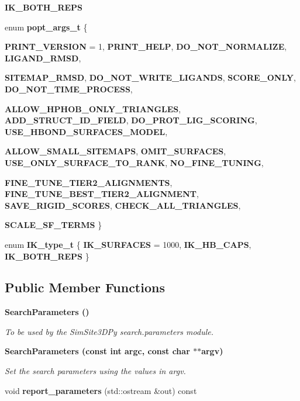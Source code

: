 \begin{CompactItemize}
\item 
\textbf{IK\_\-BOTH\_\-REPS}\label{classSimSite3D_1_1SearchParameters_c267aed4ea246dc936ccd5b47b71712d1aa6526aee8d82d030cda47ac9831efb}

\item 
enum \textbf{popt\_\-args\_\-t} \{ \par
\textbf{PRINT\_\-VERSION} =  1, 
\textbf{PRINT\_\-HELP}, 
\textbf{DO\_\-NOT\_\-NORMALIZE}, 
\textbf{LIGAND\_\-RMSD}, 
\par
\textbf{SITEMAP\_\-RMSD}, 
\textbf{DO\_\-NOT\_\-WRITE\_\-LIGANDS}, 
\textbf{SCORE\_\-ONLY}, 
\textbf{DO\_\-NOT\_\-TIME\_\-PROCESS}, 
\par
\textbf{ALLOW\_\-HPHOB\_\-ONLY\_\-TRIANGLES}, 
\textbf{ADD\_\-STRUCT\_\-ID\_\-FIELD}, 
\textbf{DO\_\-PROT\_\-LIG\_\-SCORING}, 
\textbf{USE\_\-HBOND\_\-SURFACES\_\-MODEL}, 
\par
\textbf{ALLOW\_\-SMALL\_\-SITEMAPS}, 
\textbf{OMIT\_\-SURFACES}, 
\textbf{USE\_\-ONLY\_\-SURFACE\_\-TO\_\-RANK}, 
\textbf{NO\_\-FINE\_\-TUNING}, 
\par
\textbf{FINE\_\-TUNE\_\-TIER2\_\-ALIGNMENTS}, 
\textbf{FINE\_\-TUNE\_\-BEST\_\-TIER2\_\-ALIGNMENT}, 
\textbf{SAVE\_\-RIGID\_\-SCORES}, 
\textbf{CHECK\_\-ALL\_\-TRIANGLES}, 
\par
\textbf{SCALE\_\-SF\_\-TERMS}
 \}
\item 
enum \textbf{IK\_\-type\_\-t} \{ \textbf{IK\_\-SURFACES} =  1000, 
\textbf{IK\_\-HB\_\-CAPS}, 
\textbf{IK\_\-BOTH\_\-REPS}
 \}
\end{CompactItemize}
\subsection*{Public Member Functions}
\begin{CompactItemize}
\item 
\bf{Search\-Parameters} ()\label{classSimSite3D_1_1SearchParameters_a08c1e2d66f1c849ba1fb003a6bc6b7f}

\begin{CompactList}\small\item\em To be used by the SimSite3D\-Py search.parameters module. \item\end{CompactList}\item 
\bf{Search\-Parameters} (const int argc, const char $\ast$$\ast$argv)\label{classSimSite3D_1_1SearchParameters_1acc5cc86e0834742971c7a66033c951}

\begin{CompactList}\small\item\em Set the search parameters using the values in argv. \item\end{CompactList}\item 
void \textbf{report\_\-parameters} (std::ostream \&out) const \label{classSimSite3D_1_1SearchParameters_c3a3ee055bce67d5d055a7a0a939c860}

\end{CompactItemize}
